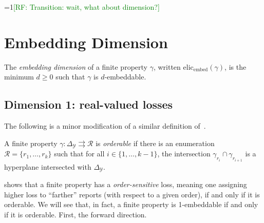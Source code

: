 \documentclass[11pt]{colt2019}
\newcommand{\Comments}{1}
\newcommand{\mynote}[2]{\ifnum\Comments=1\textcolor{#1}{#2}\fi}
\newcommand{\raf}[1]{\mynote{green}{[RF: #1]}}
\newcommand{\elicembed}{\mathrm{elic}_\mathrm{embed}}
\newcommand{\simplex}{\Delta_\Y}
\newcommand{\R}{\mathcal{R}}
\newcommand{\Y}{\mathcal{Y}}
\newcommand{\toto}{\rightrightarrows}
\begin{document}
\raf{Transition: wait, what about dimension?}

\section{Embedding Dimension}

\begin{definition}
  The \emph{embedding dimension} of a finite property $\gamma$, written $\elicembed(\gamma)$, is the minimum $d\geq 0$ such that $\gamma$ is $d$-embeddable.
\end{definition}

\subsection{Dimension 1: real-valued losses}

The following is a minor modification of a similar definition of~\citet{lambert2018elicitation}.
\begin{definition}
  A finite property $\gamma:\simplex\toto\R$ is \emph{orderable} if there is an enumeration $\R = \{r_1,\ldots,r_k\}$ such that for all $i\in\{1,\ldots,k-1\}$, the intersection $\gamma_{r_i} \cap \gamma_{r_{i+1}}$ is a hyperplane intersected with $\simplex$.
\end{definition}

\citet{lambert2018elicitation} shows that a finite property has a \emph{order-sensitive} loss, meaning one assigning higher loss to ``farther'' reports (with respect to a given order), if and only if it is orderable.
We will see that, in fact, a finite property is 1-embeddable if and only if it is orderable.
First, the forward direction.
\end{document}

